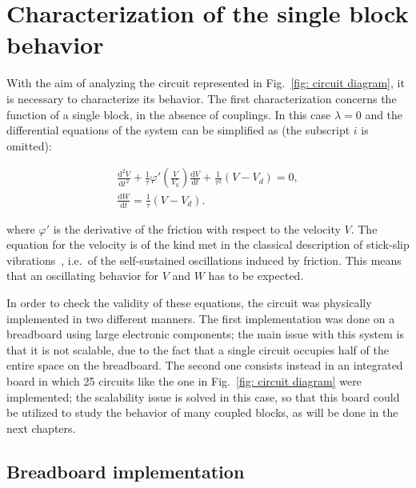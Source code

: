 \section{Characterization of the single block behavior}\label{sec: single block characterization}

With the aim of analyzing the circuit represented in Fig.~\ref{fig: circuit diagram},
it is necessary to characterize its behavior. The first characterization concerns the
function of a single block, in the absence of couplings.
In this case $\lambda=0$ and the differential equations of the system can be simplified as
(the subscript $i$ is omitted):

\begin{equation}
\label{eq: single block eq motion}
\begin{gathered}
    \frac{\text{d}^2V}{\text{d}t^2}+
    \frac{1}{\tau}\varphi'\left(\frac{V}{V_0}\right)\frac{\text{d}V}{\text{d}t}+
    \frac{1}{\tau^2}(V-V_d)=0,\\[10pt]
    \frac{\text{d}W}{\text{d}t}=\frac{1}{\tau}(V-V_d).
\end{gathered}
\end{equation}

where $\varphi'$ is the derivative of the friction with respect to the velocity $V$.
The equation for the velocity is of the kind met in the classical description of stick-slip
vibrations~\cite{ref:stick_slip}, i.e.\ of the self-sustained oscillations induced by friction.
This means that an oscillating behavior for $V$ and $W$ has to be expected.

In order to check the validity of these equations, the circuit was physically implemented
in two different manners. The first implementation was done on a breadboard using large
electronic components; the main issue with this system is that it is not scalable,
due to the fact that a single circuit occupies half of the entire space on the breadboard.
The second one consists instead in an integrated board in which 25 circuits
like the one in Fig.~\ref{fig: circuit diagram} were implemented;
the scalability issue is solved in this case, so that this board could be utilized
to study the behavior of many coupled blocks, as will be done in the next chapters.

\subsection{Breadboard implementation}\label{subsec:breadboard implementation}

